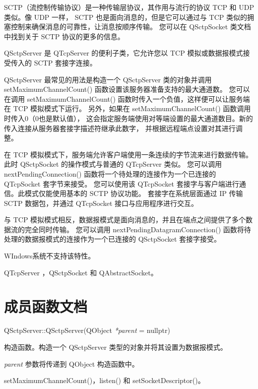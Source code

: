 SCTP（流控制传输协议）是一种传输层协议，其作用与流行的协议 TCP 和 UDP 类似。像 UDP 一样，
SCTP 也是面向消息的，但是它可以通过与 TCP 类似的拥塞控制来确保消息的可靠性，让消息按顺序传输。
您可以在 QSctpSocket 类文档中找到关于 SCTP 协议的更多的信息。

QSctpServer 是 QTcpServer 的便利子类，它允许您以 TCP 模拟或数据报模式接受传入的 SCTP 套接字连接。

QSctpServer 最常见的用法是构造一个 QSctpServer 类的对象并调用 setMaximumChannelCount() 函数设置该服务器准备支持的最大通道数。
您可以在调用 setMaximumChannelCount() 函数时传入一个负值，这样便可以让服务端在 TCP 模拟模式下运行。
另外，如果在 setMaximumChannelCount() 函数调用时传入0（0也是默认值），
这会指定服务端使用对等端设置的最大通道数目。新的传入连接从服务器套接字描述符继承此数字，
并根据远程端点设置对其进行调整。

在 TCP 模拟模式下，服务端允许客户端使用一条连续的字节流来进行数据传输。
此时 QSctpSocket 的操作模式与普通的 QTcpServer 类似。
您可以调用 nextPendingConnection() 函数将一个待处理的连接作为一个已连接的 QTcpSocket 套字节来接受。
您可以使用该 QTcpSocket 套接字与客户端进行通信。此模式仅能使用基本的 SCTP 协议功能。
套接字在系统层面通过 IP 传输 SCTP 数据包，并通过 QTcpSocket 接口与应用程序进行交互。

与 TCP 模拟模式相反，数据报模式是面向消息的，并且在端点之间提供了多个数据流的完全同时传输。
您可以调用 nextPendingDatagramConnection() 函数将待处理的数据报模式的连接作为一个已连接的 QSctpSocket 套接字接受。


\begin{notice}
WIndows系统不支持该特性。
\end{notice}

\begin{seeAlso}
QTcpServer ，QSctpSocket 和 QAbstractSocket。
\end{seeAlso}

\section{成员函数文档}

QSctpServer::QSctpServer(QObject \emph{*parent} = nullptr)

构造函数。构造一个 QSctpServer 类型的对象并将其设置为数据报模式。

\emph{parent} 参数将传递到 QObject 构造函数中。

\begin{seeAlso}
setMaximumChannelCount()，listen() 和 setSocketDescriptor()。
\end{seeAlso}

